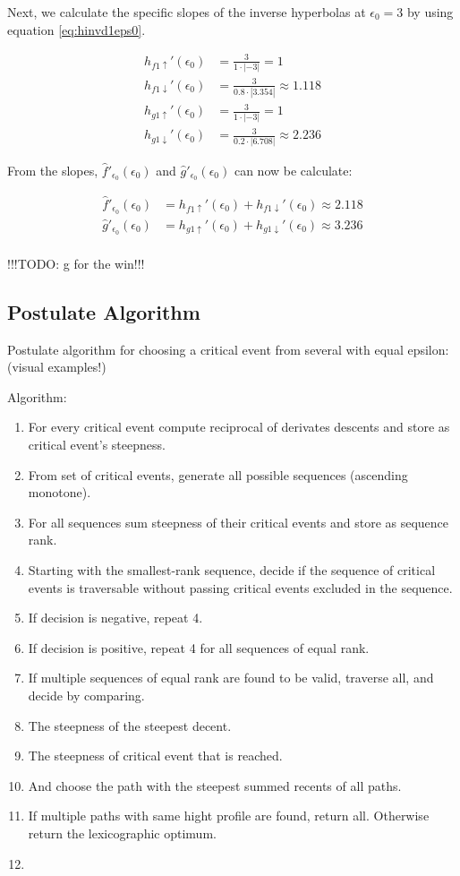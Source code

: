 Next, we calculate the specific slopes of the inverse hyperbolas at $\epsilon_0 = 3$ by using equation \ref{eq:hinvd1eps0}.

\begin{align*}
	h_{f1\uparrow}'(\epsilon_0) &= \frac{3}{1\cdot\left|-3\right|} = 1\\
	h_{f1\downarrow}'(\epsilon_0) &= \frac{3}{0.8\cdot\left|3.354\right|} \approx 1.118\\
	h_{g1\uparrow}'(\epsilon_0) &= \frac{3}{1\cdot\left|-3\right|} = 1\\
	h_{g1\downarrow}'(\epsilon_0) &= \frac{3}{0.2\cdot\left|6.708\right|} \approx 2.236 
\end{align*}

From the slopes, $\hat{f}'_{\epsilon_0}(\epsilon_0)$ and $\hat{g}'_{\epsilon_0}(\epsilon_0)$ can now be calculate:

\begin{align*}
	\hat{f}'_{\epsilon_0}(\epsilon_0) &= h_{f1\uparrow}'(\epsilon_0) + h_{f1\downarrow}'(\epsilon_0) \approx 2.118\\
	\hat{g}'_{\epsilon_0}(\epsilon_0) &= h_{g1\uparrow}'(\epsilon_0) + h_{g1\downarrow}'(\epsilon_0) \approx 3.236\\
\end{align*}

!!!TODO: g for the win!!!


\subsection{Postulate Algorithm}
Postulate algorithm for choosing a critical event from several with equal epsilon: (visual examples!)

Algorithm:
\begin{enumerate}
	\item For every critical event compute reciprocal of derivates descents and store as critical event's steepness.
	\item From set of critical events, generate all possible sequences (ascending monotone).
	\item For all sequences sum steepness of their critical events and store as sequence rank.
	\item Starting with the smallest-rank sequence, decide if the sequence of critical events is traversable without passing critical events excluded in the sequence.
	\item If decision is negative, repeat 4.
	\item If decision is positive, repeat 4 for all sequences of equal rank.
	\item If multiple sequences of equal rank are found to be valid, traverse all, and decide by comparing.
	\item The steepness of the steepest decent.
	\item The steepness of critical event that is reached.
	\item And choose the path with the steepest summed recents of all paths.
	\item If multiple paths with same hight profile are found, return all. Otherwise return the lexicographic optimum.
	\item 
\end{enumerate}

